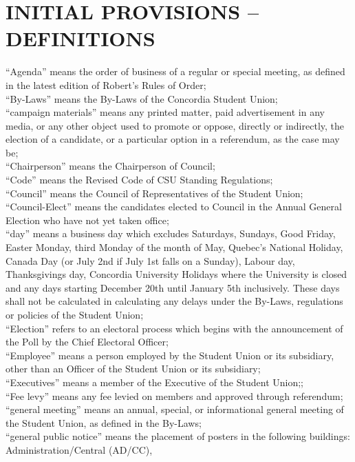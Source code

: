 \documentclass[oneside]{book}
\begin{document}
\part{\label{DEFINITIONS}INITIAL PROVISIONS -- DEFINITIONS}
``Agenda'' means the order of business of a regular
or special meeting, as defined in the latest edition of Robert's Rules
of Order; \\
 ``By-Laws'' means the By-Laws of the Concordia
Student Union; \\
``campaign materials'' means any printed
matter, paid advertisement in any media, or any other object used
to promote or oppose, directly or indirectly, the election of a candidate,
or a particular option in a referendum, as the case may be; \\
``Chairperson'' means the Chairperson of
Council; \\
``Code'' means the Revised Code of CSU Standing
Regulations; \\
``Council'' means the Council of Representatives
of the Student Union; \\
``Council-Elect'' means the candidates elected
to Council in the Annual General Election who have not yet taken office;
\\
``day'' means a business day which excludes
Saturdays, Sundays, Good Friday, Easter Monday, third Monday of the
month of May, Quebec's National Holiday, Canada Day (or July 2nd if
July 1st falls on a Sunday), Labour day, Thanksgivings day, Concordia
University Holidays where the University is closed and any days starting
December 20th until January 5th inclusively. These days shall not
be calculated in calculating any delays under the By-Laws, regulations
or policies of the Student Union; \\
``Election'' refers to an electoral process
which begins with the announcement of the Poll by the Chief Electoral
Officer; \\
``Employee'' means a person employed by
the Student Union or its subsidiary, other than an Officer of the
Student Union or its subsidiary; \\
``Executives'' means a member of the Executive
of the Student Union;; \\
``Fee levy'' means any fee levied on members
and approved through referendum; \\
``general meeting'' means an annual, special,
or informational general meeting of the Student Union, as defined
in the By-Laws; \\
``general public notice'' means the placement
of posters in the following buildings: Administration/Central (AD/CC),
\end{document}
